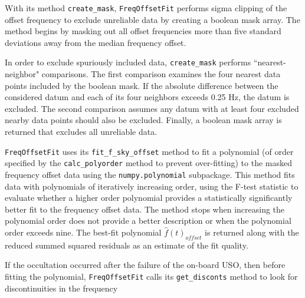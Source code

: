\documentclass[titlepage, 12pt]{article}
\begin{document}
                With its method \texttt{create\_mask}, \texttt{FreqOffsetFit}
                performs sigma clipping of the offset frequency to
                exclude unreliable data by creating a boolean mask
                array. The method begins by masking out all offset frequencies
                more than five standard deviations away from the median
                frequency offset.
                \par\hfill\par
                In order to exclude spuriously included data, \texttt{create\_mask}
                performs ``nearest-neighbor" comparisons. The first comparison
                examines the four nearest data points included by the boolean mask. If
                the absolute difference between the considered datum and each of its
                four neighbors exceeds 0.25 Hz, the datum is excluded. The second 
                comparison assumes any datum with at least four excluded nearby data
                points should also be excluded. Finally, a boolean mask array is returned 
                that excludes all unreliable data.
                \par\hfill\par
                \texttt{FreqOffsetFit} uses its \texttt{fit\_f\_sky\_offset}
                method to fit a polynomial (of order specified by the \texttt{calc\_polyorder}
                method to prevent over-fitting) to the masked frequency
                offset data using the \texttt{numpy.polynomial} subpackage. 
                This method fits data with polynomials of
                iteratively increasing order, using the F-test statistic to evaluate
                whether a higher order polynomial provides a statistically significantly better fit to the frequency
                offset data. The method stops when increasing the polynomial order
                does not provide a better description or when the polynomial order
                exceeds nine. The
                best-fit polynomial $\hat{f}(t)_{offset}$ is returned along with
                the reduced summed squared residuals as an estimate of the fit
                quality.
                \par\hfill\par
                If the occultation occurred after the failure of the on-board USO, then
                before fitting the polynomial, \texttt{FreqOffsetFit} calls its
                \texttt{get\_disconts} method to look for discontinuities in the frequency
\end{document}
